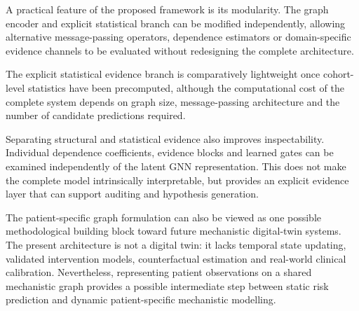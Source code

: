 A practical feature of the proposed framework is its modularity. The graph encoder and
explicit statistical branch can be modified independently, allowing alternative
message-passing operators, dependence estimators or domain-specific evidence channels
to be evaluated without redesigning the complete architecture.

The explicit statistical evidence branch is comparatively lightweight once cohort-level
statistics have been precomputed, although the computational cost of the complete system
depends on graph size, message-passing architecture and the number of candidate
predictions required.

Separating structural and statistical evidence also improves inspectability. Individual
dependence coefficients, evidence blocks and learned gates can be examined independently
of the latent GNN representation. This does not make the complete model intrinsically
interpretable, but provides an explicit evidence layer that can support auditing and
hypothesis generation.

The patient-specific graph formulation can also be viewed as one possible methodological
building block toward future mechanistic digital-twin systems. The present architecture is
not a digital twin: it lacks temporal state updating, validated intervention models,
counterfactual estimation and real-world clinical calibration. Nevertheless, representing
patient observations on a shared mechanistic graph provides a possible intermediate step
between static risk prediction and dynamic patient-specific mechanistic modelling.
